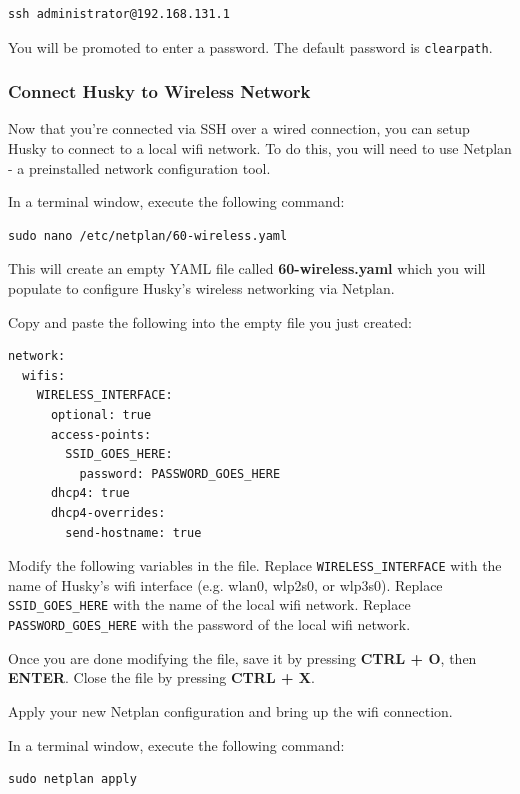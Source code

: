 \documentclass[]{clearpath-latex/clearpath-manual}
\begin{document}
\begin{lstlisting}
ssh administrator@192.168.131.1
\end{lstlisting}

You will be promoted to enter a password.  The default password is \lstinline{clearpath}.

\subsubsection{Connect Husky to Wireless Network}

Now that you're connected via SSH over a wired connection, you can setup Husky to connect to a local wifi network. To do this, you will need to use Netplan - a preinstalled network configuration tool.

In a terminal window, execute the following command:

\begin{lstlisting}
sudo nano /etc/netplan/60-wireless.yaml
\end{lstlisting}

This will create an empty YAML file called \textbf{60-wireless.yaml} which you will populate to configure Husky's wireless networking via Netplan.

Copy and paste the following into the empty file you just created:

\begin{lstlisting}
network:
  wifis:
    WIRELESS_INTERFACE:
      optional: true
      access-points:
        SSID_GOES_HERE:
          password: PASSWORD_GOES_HERE
      dhcp4: true
      dhcp4-overrides:
        send-hostname: true
\end{lstlisting}

Modify the following variables in the file. Replace \lstinline{WIRELESS_INTERFACE} with the name of Husky's wifi interface (e.g. wlan0, wlp2s0, or wlp3s0). Replace \lstinline{SSID_GOES_HERE} with the name of the local wifi network. Replace \lstinline{PASSWORD_GOES_HERE} with the password of the local wifi network. 

Once you are done modifying the file, save it by pressing \textbf{CTRL + O}, then \textbf{ENTER}. Close the file by pressing \textbf{CTRL + X}.

Apply your new Netplan configuration and bring up the wifi connection.

In a terminal window, execute the following command:

\begin{lstlisting}
sudo netplan apply
\end{lstlisting}
\end{document}
